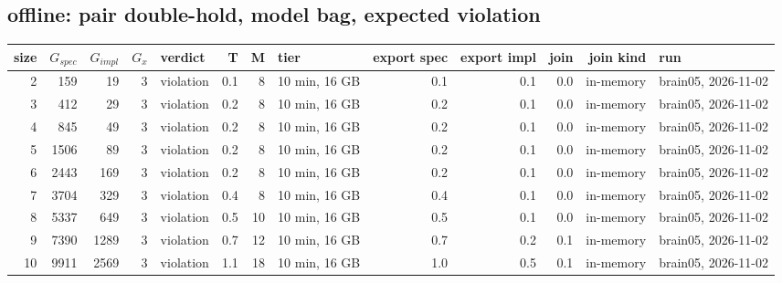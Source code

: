 \documentclass[10pt]{article}
\begin{document}
\subsection*{offline: pair \textsf{double-hold}, model bag, expected violation}
\begin{longtable}{@{}rrrrlrrlrrrrl@{}}
\toprule
size & $G_{\mathit{spec}}$ & $G_{\mathit{impl}}$ & $G_x$ & verdict & T & M & tier & export spec & export impl & join & join kind & run \\
\midrule
\endhead
\color{red} 2 & 159 & 19 & 3 & violation & 0.1 & 8 & 10 min, 16 GB & 0.1 & 0.1 & 0.0 & in-memory & brain05, 2026-11-02 \\
\color{red} 3 & 412 & 29 & 3 & violation & 0.2 & 8 & 10 min, 16 GB & 0.2 & 0.1 & 0.0 & in-memory & brain05, 2026-11-02 \\
\color{red} 4 & 845 & 49 & 3 & violation & 0.2 & 8 & 10 min, 16 GB & 0.2 & 0.1 & 0.0 & in-memory & brain05, 2026-11-02 \\
\color{red} 5 & 1506 & 89 & 3 & violation & 0.2 & 8 & 10 min, 16 GB & 0.2 & 0.1 & 0.0 & in-memory & brain05, 2026-11-02 \\
\color{red} 6 & 2443 & 169 & 3 & violation & 0.2 & 8 & 10 min, 16 GB & 0.2 & 0.1 & 0.0 & in-memory & brain05, 2026-11-02 \\
\color{red} 7 & 3704 & 329 & 3 & violation & 0.4 & 8 & 10 min, 16 GB & 0.4 & 0.1 & 0.0 & in-memory & brain05, 2026-11-02 \\
\color{red} 8 & 5337 & 649 & 3 & violation & 0.5 & 10 & 10 min, 16 GB & 0.5 & 0.1 & 0.0 & in-memory & brain05, 2026-11-02 \\
\color{red} 9 & 7390 & 1289 & 3 & violation & 0.7 & 12 & 10 min, 16 GB & 0.7 & 0.2 & 0.1 & in-memory & brain05, 2026-11-02 \\
\color{red} 10 & 9911 & 2569 & 3 & violation & 1.1 & 18 & 10 min, 16 GB & 1.0 & 0.5 & 0.1 & in-memory & brain05, 2026-11-02 \\
\bottomrule
\end{longtable}
\end{document}
